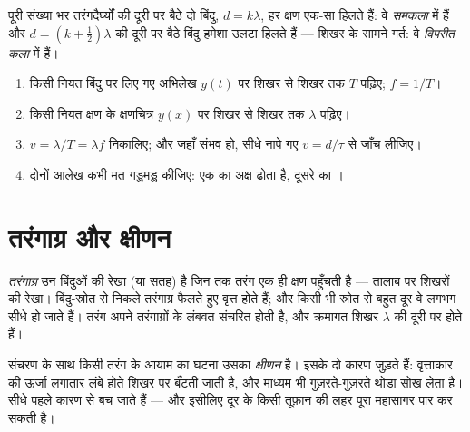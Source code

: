 \begin{definition}[समकला और विपरीत कला में]\label{def:g12:mechanical-waves:phase}
पूरी संख्या भर तरंगदैर्घ्यों की दूरी पर बैठे दो बिंदु, $d = k\lambda$, हर
क्षण एक-सा हिलते हैं: वे \emph{समकला} में हैं। और $d = (k + \tfrac12)\lambda$ की
दूरी पर बैठे बिंदु हमेशा उलटा हिलते हैं --- शिखर के सामने गर्त: वे
\emph{विपरीत कला} में हैं।
\end{definition}

\begin{method}[दुहरी आवर्तिता पढ़ना]\label{met:g12:mechanical-waves:reading}
\begin{enumerate}
  \item किसी नियत बिंदु पर लिए गए अभिलेख $y(t)$ पर शिखर से शिखर तक $T$
        पढ़िए; $f = 1/T$।
  \item किसी नियत क्षण के क्षणचित्र $y(x)$ पर शिखर से शिखर तक $\lambda$
        पढ़िए।
  \item $v = \lambda/T = \lambda f$ निकालिए; और जहाँ संभव हो, सीधे नापे गए $v = d/\tau$ से जाँच
        लीजिए।
  \item दोनों आलेख कभी मत गड्डमड्ड कीजिए: एक का अक्ष  ढोता है, दूसरे का
        ।
\end{enumerate}
\end{method}

\section{तरंगाग्र और क्षीणन}

\begin{definition}[तरंगाग्र]\label{def:g12:mechanical-waves:wavefront}
\emph{तरंगाग्र} उन बिंदुओं की रेखा (या सतह) है जिन तक
तरंग एक ही क्षण पहुँचती है --- तालाब पर शिखरों की रेखा। बिंदु-स्रोत
से निकले तरंगाग्र फैलते हुए वृत्त होते हैं; और किसी भी स्रोत से बहुत दूर वे
लगभग सीधे हो जाते हैं। तरंग अपने तरंगाग्रों के लंबवत संचरित होती है,
और क्रमागत शिखर $\lambda$ की दूरी पर होते हैं।
\end{definition}

\begin{definition}[क्षीणन]\label{def:g12:mechanical-waves:attenuation}
संचरण के साथ किसी तरंग के आयाम का घटना उसका
\emph{क्षीणन} है। इसके दो कारण जुड़ते हैं: वृत्ताकार
 की ऊर्जा लगातार लंबे होते शिखर पर बँटती जाती है,
और माध्यम भी गुज़रते-गुज़रते थोड़ा सोख लेता है। सीधे  पहले
कारण से बच जाते हैं --- और इसीलिए दूर के किसी तूफ़ान की लहर पूरा महासागर पार
कर सकती है।
\end{definition}

